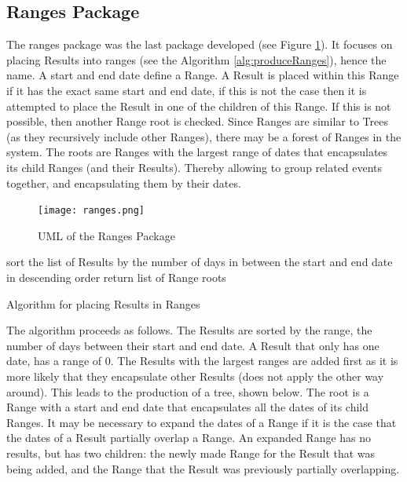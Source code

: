 \subsection{Ranges Package}
\par The ranges package was the last package developed (see Figure \ref{fig:ranges}). It focuses on placing Results into ranges (see the Algorithm \ref{alg:produceRanges}), hence the name. A start and end date define a Range. A Result is placed within this Range if it has the exact same start and end date, if this is not the case then it is attempted to place the Result in one of the children of this Range. If this is not possible, then another Range root is checked. Since Ranges are similar to Trees (as they recursively include other Ranges), there may be a forest of Ranges in the system. The roots are Ranges with the largest range of dates that encapsulates its child Ranges (and their Results). Thereby allowing to group related events together, and encapsulating them by their dates.  
\begin{figure}[H]
\caption{UML of the Ranges Package}
\label{fig:ranges}
\texttt{[image: ranges.png]}
\centering
\end{figure}
\begin{algorithm}[H]
sort the list of Results by the number of days in between the start and end date in descending order\;
return list of Range roots\;
\caption{Algorithm for placing Results in Ranges}
\label{alg:produceRanges}
\end{algorithm}
\par The algorithm proceeds as follows. The Results are sorted by the range, the number of days between their start and end date. A Result that only has one date, has a range of 0. The Results with the largest ranges are added first as it is more likely that they encapsulate other Results (does not apply the other way around). This leads to the production of a tree, shown below. The root is a Range with a start and end date that encapsulates all the dates of its child Ranges. It may be necessary to expand the dates of a Range if it is the case that the dates of a Result partially overlap a Range. An expanded Range has no results, but has two children: the newly made Range for the Result that was being added, and the Range that the Result was previously partially overlapping.

